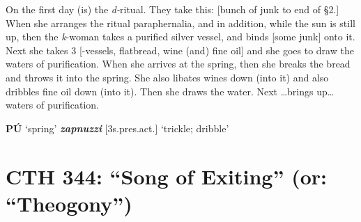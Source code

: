 \documentclass[10pt]{article}
\newcommand{\bit}[1]{\textbf{\textit{#1}}}				%
\newcommand{\p}[1]{{\tiny[{#1}]}}					%
\newcommand{\hith}{\textsubwedge{h}}
\renewcommand{\.}[1]{\textsubdot{#1}}
\begin{document}
\begin{description}
\begin{notes}
\end{notes}


\item[\S\S2--3] On the first day (is) the \textit{d-}ritual. They take this: [bunch of junk to end of \S2.] When she arranges the ritual paraphernalia, and in addition, while the sun is still up, then the \textit{k}-woman takes a purified silver vessel, and binds [some junk] onto it. Next she takes 3 {[\hith}-vessels, flatbread, wine (and) fine oil] and she goes to draw the waters of purification. When she arrives at the spring, then she breaks the bread and throws it into the spring. She also libates wines down (into it) and also dribbles fine oil down (into it). Then she draws the water. Next {\ldots}brings up{\ldots}waters of purification.


\begin{notes}

\textbf{P\'U} `spring' \bit{zapnuzzi} \p{3s.pres.act.} `trickle; dribble'

\end{notes}

\end{description}


\section{CTH 344: ``Song of Exiting'' (or: ``Theogony'')}
\end{document}
